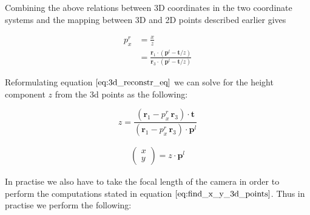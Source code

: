 \documentclass{paper}
\begin{document}
Combining the above relations between 3D coordinates in the two coordinate systems and the mapping between 3D and 2D points described earlier gives

\begin{align}
    p^{r}_{x} 
    &= \frac{x}{z} \\
    &= \frac{\mathbf{r}_{1} \cdot (\textbf{p}^{l} - \mathbf{t}/z)}{\mathbf{r}_{3} \cdot (\textbf{p}^{l} - \mathbf{t}/z)}  
\end{align}


Reformulating equation $\ref{eq:3d_reconstr_eq}$ we can solve for the height component $z$ from the 3d points as the following:

\begin{equation}
    z =  \frac{ (\mathbf{r}_{1} - p^{r}_{x} \, \mathbf{r}_{3}) \cdot \mathbf{t} }{ (\mathbf{r}_{1} - p^{r}_{x} \, \mathbf{r}_{3}) \cdot \textbf{p}^{l} }
\end{equation}


\begin{align}
\begin{pmatrix} x \\ y \end{pmatrix} = z \cdot \textbf{p}^{l}
\label{eq:find_x_y_3d_points}
\end{align}


In practise we also have to take the focal length of the camera in order to perform the computations stated in equation $\ref{eq:find_x_y_3d_points}$. Thus in practise we perform the following:



     
\end{document}
